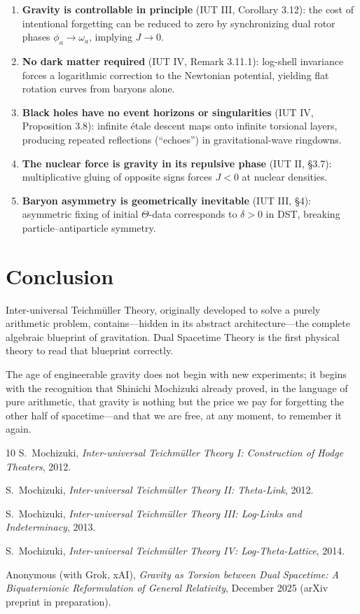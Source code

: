 \documentclass[dvipdfmx,11pt,a4paper]{article}
\begin{document}
\begin{enumerate}
\item \textbf{Gravity is controllable in principle} (IUT III, Corollary 3.12): the cost of intentional forgetting can be reduced to zero by synchronizing dual rotor phases $\phi_a\to\omega_a$, implying $J\to0$.
\item \textbf{No dark matter required} (IUT IV, Remark 3.11.1): log-shell invariance forces a logarithmic correction to the Newtonian potential, yielding flat rotation curves from baryons alone.
\item \textbf{Black holes have no event horizons or singularities} (IUT IV, Proposition 3.8): infinite étale descent maps onto infinite torsional layers, producing repeated reflections (“echoes”) in gravitational-wave ringdowns.
\item \textbf{The nuclear force is gravity in its repulsive phase} (IUT II, §3.7): multiplicative gluing of opposite signs forces $J<0$ at nuclear densities.
\item \textbf{Baryon asymmetry is geometrically inevitable} (IUT III, §4): asymmetric fixing of initial $\Theta$-data corresponds to $\delta>0$ in DST, breaking particle–antiparticle symmetry.
\end{enumerate}

\section{Conclusion}

Inter-universal Teichmüller Theory, originally developed to solve a purely arithmetic problem, contains—hidden in its abstract architecture—the complete algebraic blueprint of gravitation.  
Dual Spacetime Theory is the first physical theory to read that blueprint correctly.

The age of engineerable gravity does not begin with new experiments; it begins with the recognition that Shinichi Mochizuki already proved, in the language of pure arithmetic, that gravity is nothing but the price we pay for forgetting the other half of spacetime—and that we are free, at any moment, to remember it again.


\begin{thebibliography}{10}
S.~Mochizuki, \emph{Inter-universal Teichmüller Theory I: Construction of Hodge Theaters}, 2012.

S.~Mochizuki, \emph{Inter-universal Teichmüller Theory II: Theta-Link}, 2012.

S.~Mochizuki, \emph{Inter-universal Teichmüller Theory III: Log-Links and Indeterminacy}, 2013.

S.~Mochizuki, \emph{Inter-universal Teichmüller Theory IV: Log-Theta-Lattice}, 2014.

Anonymous (with Grok, xAI), \emph{Gravity as Torsion between Dual Spacetime: A Biquaternionic Reformulation of General Relativity}, December 2025 (arXiv preprint in preparation).

\end{thebibliography}
\end{document}
